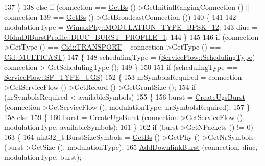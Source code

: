 \begin{DoxyCode}
137         \}
138       \textcolor{keywordflow}{else} \textcolor{keywordflow}{if} (connection == \hyperlink{classns3_1_1BSScheduler_a8b09065ac8f74cb35446af55128e41c7}{GetBs} ()->GetInitialRangingConnection () || connection
139                == \hyperlink{classns3_1_1BSScheduler_a8b09065ac8f74cb35446af55128e41c7}{GetBs} ()->GetBroadcastConnection ())
140         \{
141 
142           modulationType = \hyperlink{classns3_1_1WimaxPhy_a044c5d8a48ca992c39c2a946f6e755faaef0b78541d9b66d4e85780131e665028}{WimaxPhy::MODULATION\_TYPE\_BPSK\_12};
143           diuc = \hyperlink{classns3_1_1OfdmDlBurstProfile_a4769c73985bf918ecd21180081471a00a7551a9c00acee92830f4d780803de0c0}{OfdmDlBurstProfile::DIUC\_BURST\_PROFILE\_1};
144         \}
145 
146       \textcolor{keywordflow}{if} (connection->GetType () == \hyperlink{classns3_1_1Cid_a10b8f92080ca5790e65a0bfa2f557e0aa46fbed56841c3bf471aa84de022edf87}{Cid::TRANSPORT} || connection->GetType () == 
      \hyperlink{classns3_1_1Cid_a10b8f92080ca5790e65a0bfa2f557e0aa4d3bf31623ed09b9755d86bdfa345a4a}{Cid::MULTICAST})
147         \{
148           schedulingType = (\hyperlink{classns3_1_1ServiceFlow_a7990ba10be1e098328fd1e6382a26235}{ServiceFlow::SchedulingType}) connection->
      GetSchedulingType ();
149         \}
150 
151       \textcolor{keywordflow}{if} (schedulingType == \hyperlink{classns3_1_1ServiceFlow_a7990ba10be1e098328fd1e6382a26235a969e0b62fa12fef1dbb23913744ed594}{ServiceFlow::SF\_TYPE\_UGS})
152         \{
153           nrSymbolsRequired = connection->GetServiceFlow ()->GetRecord ()->GetGrantSize ();
154           \textcolor{keywordflow}{if} (nrSymbolsRequired < availableSymbols)
155             \{
156               burst = \hyperlink{classns3_1_1BSSchedulerSimple_a96aa7cfd2316898092c485af3b74d24c}{CreateUgsBurst} (connection->GetServiceFlow (), modulationType, 
      nrSymbolsRequired);
157             \}
158           \textcolor{keywordflow}{else}
159             \{
160               burst = \hyperlink{classns3_1_1BSSchedulerSimple_a96aa7cfd2316898092c485af3b74d24c}{CreateUgsBurst} (connection->GetServiceFlow (), modulationType, 
      availableSymbols);
161             \}
162           \textcolor{keywordflow}{if} (burst->GetNPackets () != 0)
163             \{
164               uint32\_t BurstSizeSymbols =  \hyperlink{classns3_1_1BSScheduler_a8b09065ac8f74cb35446af55128e41c7}{GetBs} ()->GetPhy ()->GetNrSymbols (burst->GetSize (), 
      modulationType);
165               \hyperlink{classns3_1_1BSSchedulerSimple_af79d1e83a763249efdb65d62173442cd}{AddDownlinkBurst} (connection, diuc, modulationType, burst);

\end{DoxyCode}
